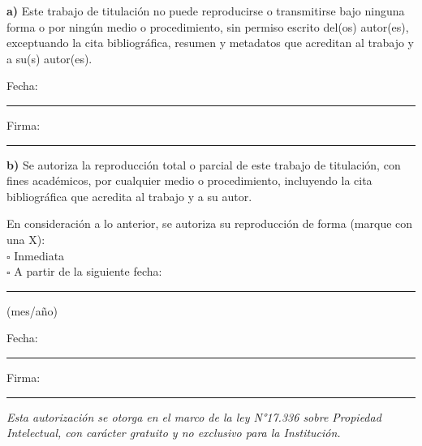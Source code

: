 \begin{singlespace}
\noindent
\textbf{a)} \quad Este trabajo de titulación no puede reproducirse o transmitirse bajo ninguna forma o por ningún medio o procedimiento, sin permiso escrito del(os) autor(es), exceptuando la cita bibliográfica, resumen y metadatos que acreditan al trabajo y a su(s) autor(es).

\vspace{0.2cm}
\noindent
Fecha: \rule{4cm}{0.4pt} \hfill Firma: \rule{5cm}{0.4pt}

\vspace{0.2cm}

\noindent
\textbf{b)} \quad Se autoriza la reproducción total o parcial de este trabajo de titulación, con fines académicos, por cualquier medio o procedimiento, incluyendo la cita bibliográfica que acredita al trabajo y a su autor.

\vspace{0.3cm}
\noindent
En consideración a lo anterior, se autoriza su reproducción de forma (marque con una X):\\[0.1cm]
$\square$ Inmediata\\
$\square$ A partir de la siguiente fecha: \rule{3cm}{0.4pt} (mes/año)

\vspace{0.2cm}
\noindent
Fecha: \rule{4cm}{0.4pt} \hfill Firma: \rule{5cm}{0.4pt}
\end{singlespace}

\vspace{0.2cm}

\begin{singlespace}
\noindent
\small\textit{Esta autorización se otorga en el marco de la ley N°17.336 sobre Propiedad Intelectual, con carácter gratuito y no exclusivo para la Institución.}
\end{singlespace}

\newpage
